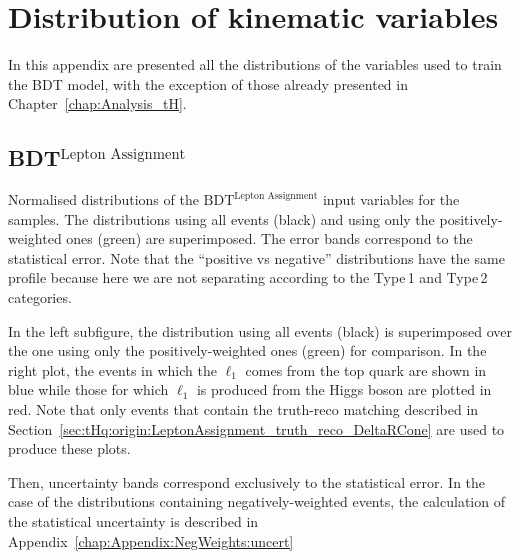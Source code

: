 \chapter{Distribution of kinematic variables}
\label{chap:Appendix:BDT_Variables}
In this appendix are presented all the distributions 
of the variables used to train the BDT model, with
the exception of those already presented in 
Chapter~\ref{chap:Analysis_tH}.




\section{BDT$^{\text{Lepton Assignment}}$}
\label{chap:Appendix:BDT_Variables:LepAssignment}

Normalised distributions of the $\text{BDT}^{\text{Lepton Assignment}}$ input variables for the \dilepSStau samples. 
The distributions using all events (black) and using only the positively-weighted ones (green)
are superimposed. The error bands correspond to the statistical error. 
Note that the ``positive vs negative'' distributions have the same profile because here we are not separating
according to the Type$\,$1 and Type$\,$2 categories. 

In the left subfigure, the distribution using all events (black) is superimposed over the one 
using only the positively-weighted ones (green) for comparison.  
In the right plot, the events in which the $\ell_{1}$ comes from the top quark
are shown in blue while those for which $\ell_{1}$ is produced from the Higgs boson
are plotted in red. Note that only events that contain the truth-reco matching described 
in Section~\ref{sec:tHq:origin:LeptonAssignment_truth_reco_DeltaRCone} are used to produce these plots.

Then, uncertainty bands correspond exclusively to the statistical error. 
In the case of the distributions containing negatively-weighted events, 
the calculation of the statistical uncertainty is described in Appendix~\ref{chap:Appendix:NegWeights:uncert}


